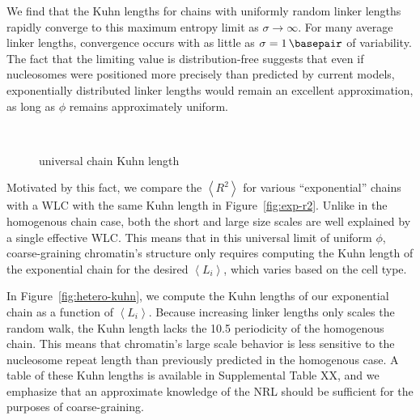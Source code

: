 \documentclass[%
 reprint,
superscriptaddress,
showpacs,preprintnumbers,
 amsmath,amssymb,
 aps,
 prl,
]{revtex4-1}
\newcommand{\RR}{\left\langle{}R^2\right\rangle{}}
\newcommand{\meanli}{\left\langle{}L_i\right\rangle}
\begin{document}
We find that the Kuhn lengths for chains with uniformly random linker lengths rapidly converge to this
maximum entropy limit as $\sigma\to\infty$. For many average linker lengths,
convergence occurs with as little as $\sigma=\SI{1}{\basepair}$ of variability. 
The fact that the limiting value is distribution-free suggests that even if nucleosomes were positioned more precisely than predicted by current models, exponentially distributed linker lengths would remain an excellent approximation, as long as $\phi$ remains approximately uniform.

\begin{figure}
    \centering
    \mbox{%
    }\caption{universal chain Kuhn length}\label{fig:exp-chain}
\end{figure}


Motivated by this fact, we compare the $\RR$ for various
    ``exponential'' chains  with a WLC with the same Kuhn length in Figure~\ref{fig:exp-r2}.
Unlike in the homogenous chain case, both the short and large size scales are
    well explained by a single effective WLC.\@
This means that in this universal limit of uniform $\phi$, coarse-graining
    chromatin's structure only requires  computing the Kuhn length of the
    exponential chain for the desired $\meanli$, which varies based on the cell
    type.

In Figure~\ref{fig:hetero-kuhn}, we compute the Kuhn lengths of our exponential
    chain as a function of $\meanli$.
Because increasing linker lengths only scales the random walk, the Kuhn length
    lacks the \SI{10.5}{\basepair} periodicity of the homogenous chain.
This means that chromatin's large scale behavior is less sensitive to
    the nucleosome repeat length than previously predicted in the homogenous
    case.
A table of these Kuhn lengths is available in Supplemental Table XX, and we
    emphasize that an approximate knowledge of the NRL should be sufficient for
    the purposes of coarse-graining.
\end{document}
